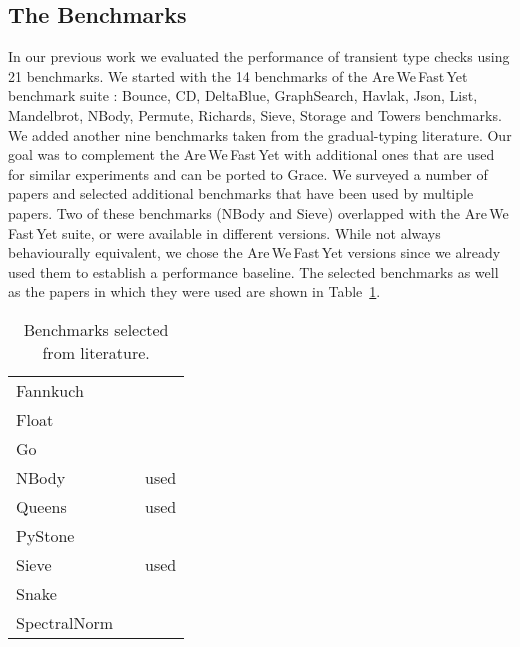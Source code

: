 \documentclass[sigplan,10pt,review,screen]{acmart}\settopmatter{printfolios=true}
\def\AWFY{Are\,We\,Fast\,Yet\xspace}
\begin{document}
\subsection{The Benchmarks}
In our previous work \cite{roberts-and-co-ecoop-2019} we evaluated the performance of transient type checks using 21 benchmarks. We started with the 14 benchmarks of the \AWFY
benchmark suite \cite{Marr2016}: Bounce, CD, DeltaBlue, GraphSearch, Havlak, Json, List, Mandelbrot, NBody, Permute, Richards, Sieve, Storage and Towers benchmarks. We added another nine benchmarks taken from the gradual-typing literature.
Our goal was to complement the \AWFY with additional ones that are used for similar experiments and can be ported to Grace.
We surveyed a number of papers
\citep{Takikawa2016,Vitousek2017,Muehlboeck2017,Bauman2017,Richards2017,Stulova2016,Greenman2018}
and selected additional benchmarks that have been used by multiple papers.
Two of these benchmarks (NBody and Sieve) overlapped with the \AWFY suite,
or were available in different versions.
While not always behaviourally equivalent,
we chose the \AWFY versions since we already used them to
establish a performance baseline.
The selected benchmarks as well as the papers in which they were used are shown in
Table~\ref{tab:gradual-benchmarks}.

\begin{table}[htb]
  \caption{Benchmarks selected from literature.}
  \label{tab:gradual-benchmarks}
  \begin{center}
    \begin{tabular}{l l r}
      Fannkuch & \cite{Vitousek2017,Greenman2018} \\
      Float & \cite{Vitousek2017,Muehlboeck2017,Greenman2018} \\
      Go & \cite{Vitousek2017,Muehlboeck2017,Greenman2018} \\
      NBody & \cite{Kuhlenschmidt:2018:preprint,Vitousek2017,Greenman2018} & used \cite{Marr2016} \\
      Queens & \cite{Vitousek2017,Muehlboeck2017,Greenman2018} & used \cite{Marr2016} \\
      PyStone & \cite{Vitousek2017,Muehlboeck2017,Greenman2018} \\
      Sieve & \cite{Takikawa2016,Muehlboeck2017,Bauman2017,Richards2017,Greenman2019jfp} & used \cite{Marr2016} \\
      Snake & \cite{Takikawa2016,Muehlboeck2017,Bauman2017,Richards2017,Greenman2019jfp} \\
      SpectralNorm & \cite{Vitousek2017,Muehlboeck2017,Greenman2018} \\
    \end{tabular}
  \end{center}
\end{table}
\end{document}
